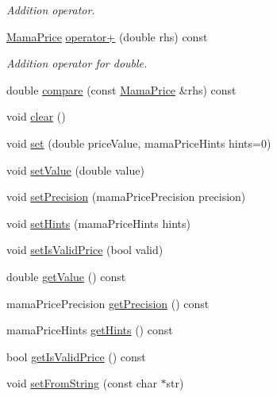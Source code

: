 \begin{DoxyCompactItemize}
\begin{DoxyCompactList}\small\item\em Addition operator. \item\end{DoxyCompactList}\item 
\hyperlink{classWombat_1_1MamaPrice}{MamaPrice} \hyperlink{classWombat_1_1MamaPrice_ad82d8eca19c0f52557552965a9956cca}{operator+} (double rhs) const 
\begin{DoxyCompactList}\small\item\em Addition operator for double. \item\end{DoxyCompactList}\item 
double \hyperlink{classWombat_1_1MamaPrice_acb33d1386aef08ce9f3fa848dc63afcc}{compare} (const \hyperlink{classWombat_1_1MamaPrice}{MamaPrice} \&rhs) const 
\item 
void \hyperlink{classWombat_1_1MamaPrice_a5f46f98011a5e1ec28c28d175e83a46a}{clear} ()
\item 
void \hyperlink{classWombat_1_1MamaPrice_a0c7b55f90dde993cc47ffc6b8f78a11a}{set} (double priceValue, mamaPriceHints hints=0)
\item 
void \hyperlink{classWombat_1_1MamaPrice_af6d547348682f72bdb2b23aee68d5990}{setValue} (double value)
\item 
void \hyperlink{classWombat_1_1MamaPrice_ac9d788606dd5f6d5e27cd216a4d504d6}{setPrecision} (mamaPricePrecision precision)
\item 
void \hyperlink{classWombat_1_1MamaPrice_afef7ffe99eefa0dec17ab47e10e67b34}{setHints} (mamaPriceHints hints)
\item 
void \hyperlink{classWombat_1_1MamaPrice_af246cbbcb60bc112a1e08c5a8d109971}{setIsValidPrice} (bool valid)
\item 
double \hyperlink{classWombat_1_1MamaPrice_a328a5ee5788f0083494185c8770f75d1}{getValue} () const 
\item 
mamaPricePrecision \hyperlink{classWombat_1_1MamaPrice_a59dd3030741d4b7d28ed6302883ada45}{getPrecision} () const 
\item 
mamaPriceHints \hyperlink{classWombat_1_1MamaPrice_a65d2a44d341047e339d10e922ce0d43c}{getHints} () const 
\item 
bool \hyperlink{classWombat_1_1MamaPrice_a9b6bcdbc3e69fac28c6404866282c3cd}{getIsValidPrice} () const 
\item 
void \hyperlink{classWombat_1_1MamaPrice_a3a4de871f54d57126894d90c2d51f7bb}{setFromString} (const char $\ast$str)
\item 

\end{DoxyCompactItemize}
